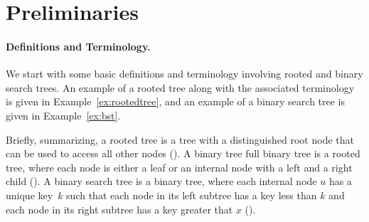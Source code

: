 \section{Preliminaries}

\paragraph{Definitions and Terminology.} 
We start with some basic definitions and terminology involving rooted
and binary search trees.  An example of a rooted tree along with the
associated terminology is given in Example~\ref{ex:rootedtree}, and an
example of a binary search tree is given in Example~\ref{ex:bst}.
%

Briefly, summarizing, a rooted tree is a tree with a distinguished
root node that can be used to access all other nodes
().
%
A binary tree full binary tree is a rooted tree, where each node is
either a leaf or an internal node with a left and a right child (). 
%
A binary search tree is a binary tree, where each internal node $u$
has a unique key~$k$ such that each node in its left subtree has a key
less than $k$ and each node in its right subtree has a key greater
that $x$ ().





